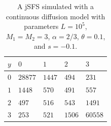 \documentclass[preprint]{elsarticle}
\begin{document}
\begin{table}[ht]
\centering
\caption{A jSFS simulated with a continuous diffusion model with parameters $L=10^5$, $M_1=M_2=3$, $\alpha=2/3$, $\theta=0.1$, and $s=-0.1$.}
  \begin{tabular}{lllll}
  \toprule
    $y$&$0$&$1$&$2$&$3$\\
    \midrule
    $0$  &$28877$ &$1447$ &$494$  &$231$\\
    $1$  &$1448$  &$570$  &$491$  &$557$\\
    $2$  &$497$   &$516$  &$543$  &$1491$\\
    $3$  &$253$   &$521$  &$1506$ &$60558$\\
    \bottomrule
  \end{tabular}\label{jointSFScont}
\end{table}
\end{document}
